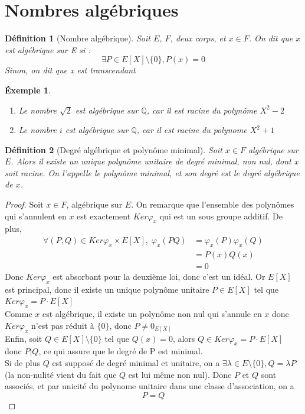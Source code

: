 \documentclass[a4paper,12pt,french]{report}
\newtheorem{definition}{Définition}[section]
\newtheorem{exemple}{Éxemple}[section]
\begin{document}
    
		\section{Nombres algébriques}
			\begin{definition}[Nombre algébrique]
				Soit \(E\), \(F\), deux corps,  et \(x \in F\). On dit que \(x\) est \emph{algébrique} sur E si : 
				\[
					\exists P \in E[X]\setminus\{0\} , P(x) = 0
				\]
				Sinon, on dit que x est \emph{transcendant}
			\end{definition}
			
			\begin{exemple}
			$ $
			    \begin{enumerate} 
				    \item Le nombre \(\sqrt{2}\) est algébrique sur $\mathbb{Q}$, car il est racine du polynôme \(X^{2} - 2\)
				    \item Le nombre $i$ est algébrique sur $\mathbb{Q}$, car il est racine du polynome \(X^{2} +1\)
			    \end{enumerate}
			\end{exemple}
			\begin{definition}[Degré algébrique et polynôme minimal]
				Soit \(x \in F \) algébrique sur \(E\). Alors il existe un unique polynôme unitaire de degré minimal, non nul, dont x soit racine. On l'appelle le \emph{polynôme minimal}, et son degré est le \emph{degré algébrique} de \(x\).{}
			\end{definition}
				\begin{proof}
					Soit \(x \in F\), algébrique sur \(E\). On remarque que l'ensemble des polynômes qui s'annulent en \(x\) est exactement \(Ker \varphi_{x}\) qui est un sous groupe additif. De plus, 
					\[
						\begin{aligned}
							\forall (P,Q) \in Ker\varphi_{x} \times E[X], \; \varphi_{x}(PQ) &= \varphi_{x}(P)\varphi_{x}(Q) \\
											&=P(x)Q(x) \\
											&= 0
						\end{aligned}
					\]
					Donc \(Ker \varphi_{x}\) est absorbant pour la deuxième loi, donc c'est un idéal. Or \(E[X]\) est principal, donc il existe un unique polynôme unitaire \(P \in E[X]\) tel que \(Ker \varphi_{x} = P \cdot E[X]\)\\
					Comme \(x\) est algébrique, il existe un polynôme non nul qui s'annule en \(x\) donc \(Ker \varphi_{x}\) n'est pas réduit à \(\{0\}\), donc \(P \neq 0_{E[X]}\) \\
					Enfin, soit \(Q \in E[X]\setminus\{0\}\) tel que \( Q(x) = 0 \), alors \(Q \in Ker \varphi_{x} = P \cdot E[X] \) donc \(P | Q\), ce qui assure que le degré de P est minimal.\\
					Si de plus \(Q\) est supposé de degré minimal et unitaire, on a \(\exists \lambda \in E\setminus\{0\} , Q = \lambda P \) (la non-nulité vient du fait que \(Q\) est lui même non nul). Donc \(P\) et \(Q\) sont associés, et par unicité du polynome unitaire dans une classe d'association, on a \[P = Q\] 
				\end{proof}
			
\end{document}
